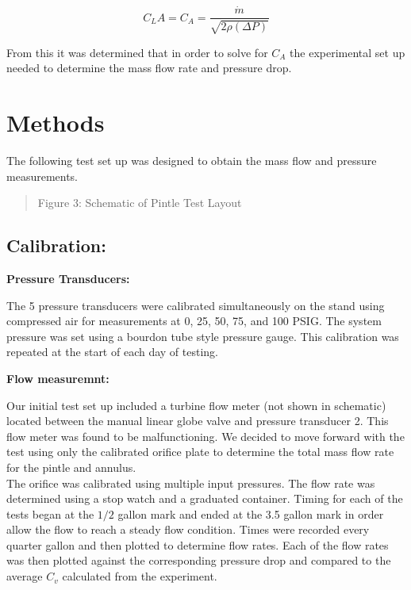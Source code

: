 \documentclass[11pt]{article}
\begin{document}
\begin{equation}
C_LA = C_A = \frac{\dot{m}}{\sqrt{2\rho(\Delta P)}}
\label{eq5}
\tag{5}
\end{equation}

From this it was determined that in order to solve for \(C_A\) the
experimental set up needed to determine the mass flow rate and pressure
drop.

    \section{Methods}\label{methods}

The following test set up was designed to obtain the mass flow and
pressure measurements.

\begin{quote}
Figure 3: Schematic of Pintle Test Layout
\end{quote}

\subsection{Calibration:}\label{calibration}

\textbf{Pressure Transducers:}

The 5 pressure transducers were calibrated simultaneously on the stand
using compressed air for measurements at 0, 25, 50, 75, and 100 PSIG.
The system pressure was set using a bourdon tube style pressure gauge.
This calibration was repeated at the start of each day of testing.

\textbf{Flow measuremnt:}

Our initial test set up included a turbine flow meter (not shown in
schematic) located between the manual linear globe valve and pressure
transducer 2. This flow meter was found to be malfunctioning. We decided
to move forward with the test using only the calibrated orifice plate to
determine the total mass flow rate for the pintle and annulus.\\
The orifice was calibrated using multiple input pressures. The flow rate
was determined using a stop watch and a graduated container. Timing for
each of the tests began at the \(1/2\) gallon mark and ended at the 3.5
gallon mark in order allow the flow to reach a steady flow condition.
Times were recorded every quarter gallon and then plotted to determine
flow rates. Each of the flow rates was then plotted against the
corresponding pressure drop and compared to the average \(C_v\)
calculated from the experiment.
\end{document}
